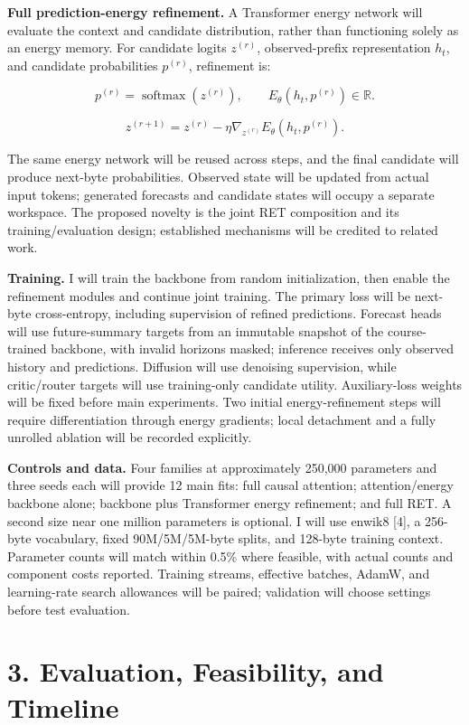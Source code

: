 \documentclass[11pt,letterpaper]{article}
\begin{document}
\textbf{Full prediction-energy refinement.} A Transformer energy network will evaluate the context and candidate distribution, rather than functioning solely as an energy memory. For candidate logits \(z^{(r)}\), observed-prefix representation \(h_t\), and candidate probabilities \(p^{(r)}\), refinement is:

\[
p^{(r)}=\operatorname{softmax}(z^{(r)}),\qquad
E_\theta(h_t,p^{(r)})\in\mathbb{R}.
\]

\[
z^{(r+1)}=z^{(r)}-\eta\nabla_{z^{(r)}}E_\theta(h_t,p^{(r)}).
\]

The same energy network will be reused across steps, and the final candidate will produce next-byte probabilities. Observed state will be updated from actual input tokens; generated forecasts and candidate states will occupy a separate workspace. The proposed novelty is the joint RET composition and its training/evaluation design; established mechanisms will be credited to related work.

\textbf{Training.} I will train the backbone from random initialization, then enable the refinement modules and continue joint training. The primary loss will be next-byte cross-entropy, including supervision of refined predictions. Forecast heads will use future-summary targets from an immutable snapshot of the course-trained backbone, with invalid horizons masked; inference receives only observed history and predictions. Diffusion will use denoising supervision, while critic/router targets will use training-only candidate utility. Auxiliary-loss weights will be fixed before main experiments. Two initial energy-refinement steps will require differentiation through energy gradients; local detachment and a fully unrolled ablation will be recorded explicitly.

\textbf{Controls and data.} Four families at approximately 250,000 parameters and three seeds each will provide 12 main fits: full causal attention; attention/energy backbone alone; backbone plus Transformer energy refinement; and full RET. A second size near one million parameters is optional. I will use enwik8 [4], a 256-byte vocabulary, fixed 90M/5M/5M-byte splits, and 128-byte training context. Parameter counts will match within 0.5\% where feasible, with actual counts and component costs reported. Training streams, effective batches, AdamW, and learning-rate search allowances will be paired; validation will choose settings before test evaluation.

\newpage
\section*{3. Evaluation, Feasibility, and Timeline}
\end{document}
